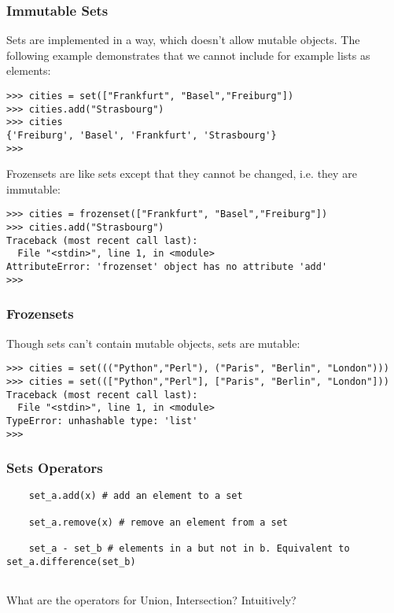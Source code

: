 \begin{frame}[fragile]\frametitle{Immutable Sets}
Sets are implemented in a way, which doesn't allow mutable objects. The following example demonstrates that we cannot include for example lists as elements:
\begin{lstlisting}
>>> cities = set(["Frankfurt", "Basel","Freiburg"])
>>> cities.add("Strasbourg")
>>> cities
{'Freiburg', 'Basel', 'Frankfurt', 'Strasbourg'}
>>> 
\end{lstlisting}
Frozensets are like sets except that they cannot be changed, i.e. they are immutable:
\begin{lstlisting}
>>> cities = frozenset(["Frankfurt", "Basel","Freiburg"])
>>> cities.add("Strasbourg")
Traceback (most recent call last):
  File "<stdin>", line 1, in <module>
AttributeError: 'frozenset' object has no attribute 'add'
>>> 
\end{lstlisting}
\end{frame}

\begin{frame}[fragile]\frametitle{Frozensets}
Though sets can't contain mutable objects, sets are mutable: 

\begin{lstlisting}
>>> cities = set((("Python","Perl"), ("Paris", "Berlin", "London")))
>>> cities = set((["Python","Perl"], ["Paris", "Berlin", "London"]))
Traceback (most recent call last):
  File "<stdin>", line 1, in <module>
TypeError: unhashable type: 'list'
>>> 
\end{lstlisting}

\end{frame}
%


%

\begin{frame}[fragile] \frametitle{Sets Operators}
  \begin{lstlisting}
    set_a.add(x) # add an element to a set
    
    set_a.remove(x) # remove an element from a set
    
    set_a - set_b # elements in a but not in b. Equivalent to set_a.difference(set_b)
    
\end{lstlisting}
What are the operators for Union, Intersection? Intuitively?
\end{frame}


